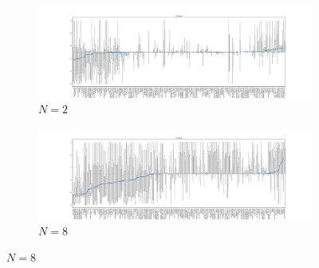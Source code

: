 \documentclass{article}
\begin{document}
\begin{figure}[!hbtp]
    \centering
    \begin{subfigure}[t]{\textwidth}
        \centering
        \includegraphics[width=\textwidth]{../img/fixation_boxplot_2_std.pdf}
        \caption{\(N=2\)}
    \end{subfigure}%



    \begin{subfigure}[t]{\textwidth}
        \centering
        \includegraphics[width=\textwidth]{../img/fixation_boxplot_8_std.pdf}
        \caption{\(N=8\)}
    \end{subfigure}%




\end{figure}
\end{document}
